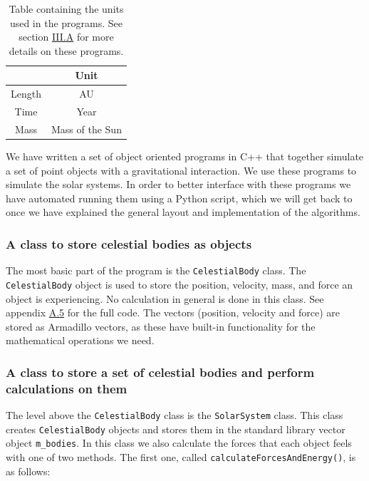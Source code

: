 \documentclass[reprint,english,notitlepage]{revtex4-1}  %
\begin{document}
\begin{table}[h!] \label{table:III:a:i}
\caption{Table containing the units used in the programs. See section \hyperref[sec:III:a]{III.A} for more details on these programs.}
\begin{tabular}{|c|c|}
\hline
 & Unit \\
\hline
Length & AU \\
Time & Year \\
Mass & Mass of the Sun \\
\hline
\end{tabular}
\end{table}

We have written a set of object oriented programs in C++ that together simulate a set of point objects with a gravitational interaction. We use these programs to simulate the solar systems. In order to better interface with these programs we have automated running them using a Python script, which we will get back to once we have explained the general layout and implementation of the algorithms. 

\subsubsection{A class to store celestial bodies as objects} \label{sec:III:a:1}

The most basic part of the program is the \verb+CelestialBody+ class. The \verb+CelestialBody+ object is used to store the position, velocity, mass, and force an object is experiencing. No calculation in general is done in this class. See appendix \hyperref[A.5]{A.5} for the full code. The vectors (position, velocity and force) are stored as Armadillo \citep{Armadillo} vectors, as these have built-in functionality for the mathematical operations we need.

\subsubsection{A class to store a set of celestial bodies and perform calculations on them} \label{sec:III:a:2}

The level above the \verb+CelestialBody+ class is the \verb+SolarSystem+ class. This class creates \verb+CelestialBody+ objects and stores them in the standard library vector object \verb+m_bodies+. In this class we also calculate the forces that each object feels with one of two methods. The first one, called \verb+calculateForcesAndEnergy()+, is as follows:
\end{document}
